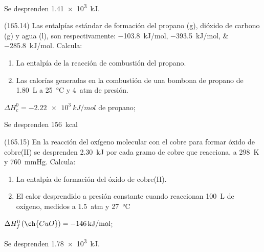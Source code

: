  \begin{solution}
    Se desprenden \SI{1.41e3}{kJ}.
  \end{solution}




  \begin{exercise}[
      tags    = {},
      topics  = {química, termodinámica, termoquímica},
      source  = {FQ 1B MGH 2016, p165, e6},
    ]
    (165.14) Las entalpías estándar de formación del propano (g),
    dióxido de carbono (g) y agua (l), son respectivamente:
    \SIlist{-103,8;-393,5;-285,8}{kJ/mol}. Calcula:
    \begin{enumerate}
      \item La entalpía de la reacción de combustión del propano.
      \item Las calorías generadas en la combustión de una bombona de propano de \SI{1.80}{\liter} a \SI{25}{\celsius} y \SI{4}{atm} de presión.
    \end{enumerate}
  \end{exercise}

  \begin{solution}
    \begin{enumerate*}
      \item \( \Delta H^0_c = \SI{-2.22e3}{kJ/mol} \) de propano;
      \item Se desprenden \SI{156}{kcal}
    \end{enumerate*}
  \end{solution}




  \begin{exercise}[
      tags    = {},
      topics  = {química, termodinámica, termoquímica},
      source  = {FQ 1B MGH 2016, p165, e15},
    ]
    (165.15) En la reacción del oxígeno molecular con el cobre para formar
    óxido de cobre(II) se desprenden \SI{2.30}{kJ} por cada gramo de
    cobre que reacciona, a \SI{298}{\kelvin} y \SI{760}{\mmHg}. Calcula:
    \begin{enumerate}
      \item La entalpía de formación del óxido de cobre(II).
      \item El calor desprendido a presión constante cuando reaccionan \SI{100}{\liter} de oxígeno, medidos a \SI{1.5}{atm} y \SI{27}{\celsius}
    \end{enumerate}
  \end{exercise}

  \begin{solution}
    \begin{enumerate*}
      \item \( \Delta H^0_f\,(\ch{CuO}) = \SI{-146}{kJ/mol} \);
      \item Se desprenden \SI{1.78e3}{kJ}.
    \end{enumerate*}
  \end{solution}




